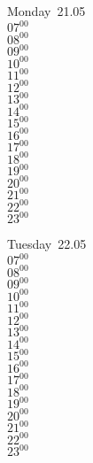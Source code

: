 \documentclass[11pt, a4paper]{book}\usepackage[]{graphicx}\usepackage[]{color}
\begin{document}
\begin{headerbox}
\end{headerbox}
\begin{weekdaybox}
  Monday~21.05\\
  { 
  \vfill
  $07^{00}$\\
$08^{00}$\\
$09^{00}$\\
$10^{00}$\\
$11^{00}$\\
$12^{00}$\\
$13^{00}$\\
$14^{00}$\\
$15^{00}$\\
$16^{00}$\\
$17^{00}$\\
$18^{00}$\\
$19^{00}$\\
$20^{00}$\\
$21^{00}$\\
$22^{00}$\\
$23^{00}$\\
  }
\end{weekdaybox}
\begin{weekdaybox}
  Tuesday~22.05\\
  { 
  \vfill
  $07^{00}$\\
$08^{00}$\\
$09^{00}$\\
$10^{00}$\\
$11^{00}$\\
$12^{00}$\\
$13^{00}$\\
$14^{00}$\\
$15^{00}$\\
$16^{00}$\\
$17^{00}$\\
$18^{00}$\\
$19^{00}$\\
$20^{00}$\\
$21^{00}$\\
$22^{00}$\\
$23^{00}$\\
  }
\end{weekdaybox}
\end{document}
